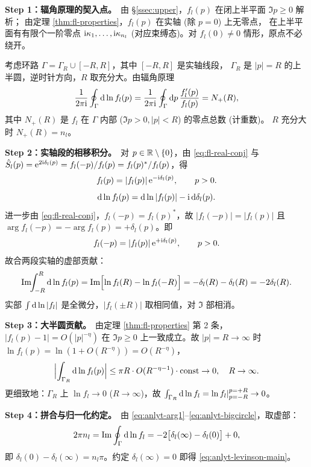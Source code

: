 \begin{proof*}
\textbf{Step 1：辐角原理的契入点。}\,
由 \S\ref{ssec:upper}，$f_l(p)$ 在闭上半平面 $\Im p\geq 0$ 解析；
由定理 \ref{thm:fl-properties}，$f_l(p)$ 在实轴 (除 $p=0$) 上无零点，
在上半平面有有限个一阶零点 $\mathrm{i}\kappa_1,\ldots,\mathrm{i}\kappa_{n_l}$
(对应束缚态)。对 $f_l(0)\neq 0$ 情形，原点不必绕开。

考虑环路 $\Gamma=\Gamma_R\cup[-R,R]$，其中 $[-R,R]$ 是实轴线段，
$\Gamma_R$ 是 $|p|=R$ 的上半圆，逆时针方向，$R$ 取充分大。由辐角原理
\begin{equation}
\frac{1}{2\pi\mathrm{i}}\oint_\Gamma\mathrm{d}\ln f_l(p)
=\frac{1}{2\pi\mathrm{i}}\oint_\Gamma\mathrm{d} p\,\frac{f_l'(p)}{f_l(p)}
=N_+(R),
\label{eq:anlyt-arg1}
\end{equation}
其中 $N_+(R)$ 是 $f_l$ 在 $\Gamma$ 内部 ($\Im p>0,|p|<R$) 的零点总数 (计重数)。
$R$ 充分大时 $N_+(R)=n_l$。

\textbf{Step 2：实轴段的相移积分。}\,
对 $p\in\mathbb{R}\setminus\{0\}$，由 \eqref{eq:fl-real-conj} 与
$\hat{S}_l(p)=\mathrm{e}^{2\mathrm{i}\delta_l(p)}=f_l(-p)/f_l(p)=f_l(p)^*/f_l(p)$，得
\begin{equation}
f_l(p) = |f_l(p)|\,\mathrm{e}^{-\mathrm{i}\delta_l(p)},\qquad p>0.
\label{eq:anlyt-fl-modphase}
\end{equation}
\begin{equation}
\mathrm{d}\ln f_l(p) = \mathrm{d}\ln|f_l(p)| - \mathrm{i}\,\mathrm{d}\delta_l(p).
\label{eq:anlyt-dlogfl}
\end{equation}
进一步由 \eqref{eq:fl-real-conj}，$f_l(-p)=f_l(p)^*$，故 $|f_l(-p)|=|f_l(p)|$
且 $\arg f_l(-p)=-\arg f_l(p)=+\delta_l(p)$。即
\begin{equation}
f_l(-p)=|f_l(p)|\,\mathrm{e}^{+\mathrm{i}\delta_l(p)},\qquad p>0.
\label{eq:anlyt-fl-neg}
\end{equation}
故合两段实轴的虚部贡献：
\begin{equation}
\Im\!\!\int_{-R}^{R}\mathrm{d}\ln f_l(p)
=\Im\Bigl[\ln f_l(R)-\ln f_l(-R)\Bigr]
=-\delta_l(R)-\delta_l(R)=-2\delta_l(R).
\label{eq:anlyt-real-imag}
\end{equation}
实部 $\int\mathrm{d}\ln|f_l|$ 是全微分，$|f_l(\pm R)|$ 取相同值，对 $\Im$ 部相消。

\textbf{Step 3：大半圆贡献。}\,
由定理 \ref{thm:fl-properties} 第 2 条，$|f_l(p)-1|=O(|p|^{-\eta})$ 在 $\Im p\geq 0$
上一致成立。故 $|p|=R\to\infty$ 时 $\ln f_l(p)=\ln(1+O(R^{-\eta}))=O(R^{-\eta})$，
\begin{equation}
\Bigl|\int_{\Gamma_R}\mathrm{d}\ln f_l(p)\Bigr|
\leq \pi R\cdot O(R^{-\eta-1})\cdot \mathrm{const} \to 0,\quad R\to\infty.
\label{eq:anlyt-bigcircle}
\end{equation}
更细致地：$\Gamma_R$ 上 $\ln f_l\to 0$ ($R\to\infty$)，故
$\int_{\Gamma_R}\mathrm{d}\ln f_l = \ln f_l|_{p=-R}^{p=+R}\to 0$。

\textbf{Step 4：拼合与归一化约定。}\,
由 \eqref{eq:anlyt-arg1}--\eqref{eq:anlyt-bigcircle}，取虚部：
\begin{equation}
2\pi n_l = \Im\oint_\Gamma\mathrm{d}\ln f_l = -2\bigl[\delta_l(\infty)-\delta_l(0)\bigr]+0,
\label{eq:anlyt-levinson-acc}
\end{equation}
即 $\delta_l(0)-\delta_l(\infty)=n_l\pi$。约定 $\delta_l(\infty)=0$ 即得
\eqref{eq:anlyt-levinson-main}。
\end{proof*}

